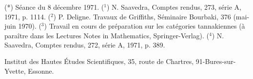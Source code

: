 (*) Séance du 8 décembre 1971.
(${}^1$) N. Saavedra, Comptes rendus, 273, série A, 1971, p. 1114.
(${}^2$) P. Deligne. Travaux de Griffiths, Séminaire Bourbaki, 376 (mai-juin 1970).
(${}^3$) Travail en cours de préparation sur les catégories tannakiennes (à paraître dans
les Lectures Notes in Mathematics, Springer-Verlag).
(${}^4$) N. Saavedra, Comptes rendus, 272, série A, 1971, p. 389.

Institut
des Hautes Études Scientifiques,
35, route de Chartres,
91-Bures-sur-Yvette,
Essonne.

